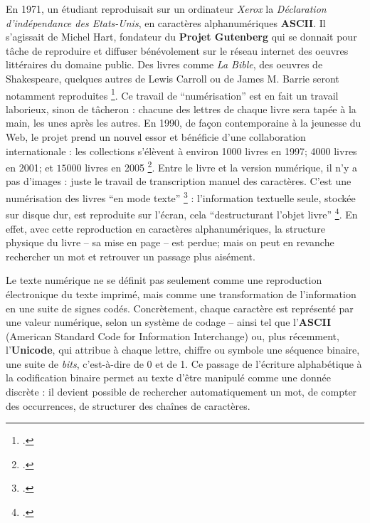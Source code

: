 En 1971, un étudiant reproduisait sur un ordinateur \emph{Xerox} la \emph{Déclaration d'indépendance des Etats-Unis}, en caractères alphanumériques \textbf{ASCII}. Il s'agissait de Michel Hart, fondateur du \textbf{Projet Gutenberg} qui se donnait pour tâche de reproduire et diffuser bénévolement sur le réseau internet des oeuvres littéraires du domaine public. Des livres comme \emph{La Bible}, des oeuvres de Shakespeare, quelques autres de Lewis Carroll ou de James M. Barrie seront notamment reproduites \footcite[][]{lebert}. Ce travail de \enquote{numérisation} est en fait un travail laborieux, sinon de tâcheron : chacune des lettres de chaque livre sera tapée à la main, les unes après les autres. En 1990, de façon contemporaine à la jeunesse du Web, le projet prend un nouvel essor et bénéficie d'une collaboration internationale : les collections s'élèvent à environ 1000 livres en 1997; 4000 livres en 2001; et $15000$ livres en 2005 \footcite[][]{lebert}. Entre le livre et la version numérique, il n'y a pas d'images : juste le travail de transcription manuel des caractères. C'est une numérisation des livres \enquote{en mode texte} \footcite[][30-33]{bermesbook} : l'information textuelle seule, stockée sur disque dur, est reproduite sur l'écran, cela \enquote{destructurant l'objet livre} \footcite[][]{bermesbook}. En effet, avec cette reproduction en caractères alphanumériques, la structure physique du livre -- sa mise en page -- est perdue; mais on peut en revanche rechercher un mot et retrouver un passage plus aisément. 

Le texte numérique ne se définit pas seulement comme une reproduction électronique du texte imprimé, mais comme une transformation de l’information en une suite de signes codés. Concrètement, chaque caractère est représenté par une valeur numérique, selon un système de codage -- ainsi tel que l’\textbf{ASCII} (American Standard Code for Information Interchange) ou, plus récemment, l’\textbf{Unicode}, qui attribue à chaque lettre, chiffre ou symbole une séquence binaire, une suite de \emph{bits}, c’est-à-dire de 0 et de 1. Ce passage de l’écriture alphabétique à la codification binaire permet au texte d’être manipulé comme une donnée discrète : il devient possible de rechercher automatiquement un mot, de compter des occurrences, de structurer des chaînes de caractères.

